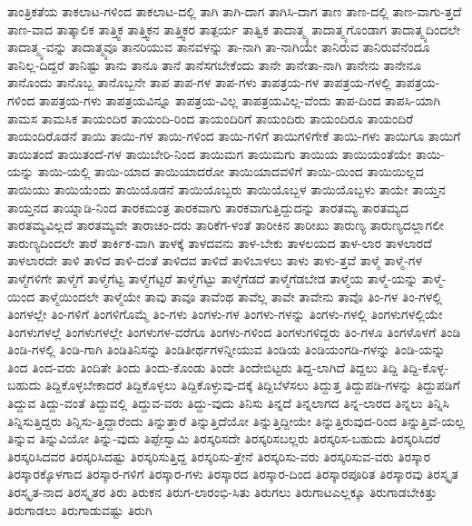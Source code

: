 {ತಾಂತ್ರಿಕತೆಯ
ತಾಕಲಾಟ-ಗಳಿಂದ
ತಾಕಲಾಟ-ದಲ್ಲಿ
ತಾಗಿ
ತಾಗಿ-ದಾಗ
ತಾಗಿಸಿ-ದಾಗ
ತಾಣ
ತಾಣ-ದಲ್ಲಿ
ತಾಣ-ವಾಗು-ತ್ತದೆ
ತಾಣ-ವಾದ
ತಾತ್ಕಾಲಿಕ
ತಾತ್ತ್ವಿಕ
ತಾತ್ತ್ವಿಕನ
ತಾತ್ತ್ವಿಕರ
ತಾತ್ಪರ್ಯ
ತಾತ್ವಿಕ
ತಾದಾತ್ಮ್ಯ
ತಾದಾತ್ಮ್ಯಗೊಂಡಾಗ
ತಾದಾತ್ಮ್ಯದಿಂದಲೇ
ತಾದಾತ್ಮ್ಯ-ವನ್ನು
ತಾದಾತ್ಮ್ಯವೂ
ತಾನರಿಯುವ
ತಾನವಳನ್ನು
ತಾ-ನಾಗಿ
ತಾ-ನಾಗಿಯೇ
ತಾನಿರುವ
ತಾನಿರುವೆನೆಂದೂ
ತಾನಿಲ್ಲ-ದಿದ್ದರೆ
ತಾನಿಷ್ಟು
ತಾನು
ತಾನೂ
ತಾನೆ
ತಾನೆಸಗಬೇಕೆಂದು
ತಾನೇ
ತಾನೇತಾ-ನಾಗಿ
ತಾನೇನು
ತಾನೇನೂ
ತಾನೊಂದು
ತಾನೊಬ್ಬ
ತಾನೊಬ್ಬನೇ
ತಾಪ
ತಾಪ-ಗಳ
ತಾಪ-ಗಳು
ತಾಪತ್ರಯ-ಗಳ
ತಾಪತ್ರಯ-ಗಳಲ್ಲಿ
ತಾಪತ್ರಯ-ಗಳಿಂದ
ತಾಪತ್ರಯ-ಗಳು
ತಾಪತ್ರಯವಿನ್ನೂ
ತಾಪತ್ರಯ-ವಿಲ್ಲ
ತಾಪತ್ರಯವಿಲ್ಲ-ವೆಂದು
ತಾಪ-ದಿಂದ
ತಾಪಸಿ-ಯಾಗಿ
ತಾಮಸ
ತಾಮಸಿಕ
ತಾಯಂದಿರ
ತಾಯಂದಿ-ರಿಂದ
ತಾಯಂದಿರಿಗೆ
ತಾಯಂದಿರು
ತಾಯಂದಿರೂ
ತಾಯಂದಿರೆ
ತಾಯಂದಿರೊಡನೆ
ತಾಯಿ
ತಾಯಿ-ಗಳ
ತಾಯಿ-ಗಳಿಂದ
ತಾಯಿ-ಗಳಿಗೆ
ತಾಯಿಗಳಿಗೇಕೆ
ತಾಯಿ-ಗಳು
ತಾಯಿಗೂ
ತಾಯಿಗೆ
ತಾಯಿತಂದೆ
ತಾಯಿತಂದೆ-ಗಳ
ತಾಯಿಬೇರಿ-ನಿಂದ
ತಾಯಿಮಗ
ತಾಯಿಮಗು
ತಾಯಿಯ
ತಾಯಿಯಂತೆಯೇ
ತಾಯಿ-ಯನ್ನು
ತಾಯಿ-ಯಲ್ಲಿ
ತಾಯಿ-ಯಾದ
ತಾಯಿಯಾದರೋ
ತಾಯಿಯಾದವಳಿಗೆ
ತಾಯಿ-ಯಿಂದ
ತಾಯಿಯಿಲ್ಲದ
ತಾಯಿಯು
ತಾಯಿಯೆಂದು
ತಾಯಿಯೊಡನೆ
ತಾಯಿಯೊಬ್ಬರು
ತಾಯಿಯೊಬ್ಬಳ
ತಾಯಿಯೊಬ್ಬಳು
ತಾಯೇ
ತಾಯ್ತನ
ತಾಯ್ತನದ
ತಾಯ್ನಾಡಿ-ನಿಂದ
ತಾರಕಮಂತ್ರ
ತಾರಕವಾಗು
ತಾರಕವಾಗುತ್ತಿದ್ದುದನ್ನು
ತಾರತಮ್ಯ
ತಾರತಮ್ಯದ
ತಾರತಮ್ಯವಿಲ್ಲದೆ
ತಾರತಮ್ಯವೇ
ತಾರಾಚಂ-ದರು
ತಾರಿಕೆಗ-ಳಂತೆ
ತಾರೀಕಿನ
ತಾರೀಖು
ತಾರುಣ್ಯ
ತಾರುಣ್ಯದಲ್ಲಾಗಲೀ
ತಾರುಣ್ಯದಿಂದಲೇ
ತಾರೆ
ತಾರ್ಕಿಕ-ವಾಗಿ
ತಾಳಕ್ಕೆ
ತಾಳದವನು
ತಾಳ-ಬೇಕು
ತಾಳಲಯದ
ತಾಳ-ಲಾರ
ತಾಳಲಾರದೆ
ತಾಳಲಾರದೇ
ತಾಳಿ
ತಾಳಿದ
ತಾಳಿ-ದಂತೆ
ತಾಳಿದವ
ತಾಳಿದೆ
ತಾಳಿಬಾಳಲು
ತಾಳು
ತಾಳು-ತ್ತವೆ
ತಾಳ್ಮೆ
ತಾಳ್ಮೆ-ಗಳ
ತಾಳ್ಮೆಗಳಿಗೇ
ತಾಳ್ಮೆಗೆ
ತಾಳ್ಮೆಗೆಟ್ಟ
ತಾಳ್ಮೆಗೆಟ್ಟರೆ
ತಾಳ್ಮೆಗೆಟ್ಟು
ತಾಳ್ಮೆಗೆಡದೆ
ತಾಳ್ಮೆಗೆಡಬೇಡ
ತಾಳ್ಮೆಯ
ತಾಳ್ಮೆ-ಯನ್ನು
ತಾಳ್ಮೆ-ಯಿಂದ
ತಾಳ್ಮೆಯಿಂದಲೇ
ತಾಳ್ಮೆಯೇ
ತಾವು
ತಾವೂ
ತಾವೆಂಥ
ತಾವೆಲ್ಲ
ತಾವೇ
ತಾವೇನು
ತಾವೊ
ತಿಂ-ಗಳ
ತಿಂ-ಗಳಲ್ಲಿ
ತಿಂಗಳಲ್ಲೇ
ತಿಂ-ಗಳಿಗೆ
ತಿಂಗಳಿಗೊಮ್ಮೆ
ತಿಂ-ಗಳು
ತಿಂಗಳು-ಗಳ
ತಿಂಗಳು-ಗಳನ್ನು
ತಿಂಗಳು-ಗಳಲ್ಲಿ
ತಿಂಗಳುಗಳಲ್ಲಿಯೇ
ತಿಂಗಳುಗಳಲ್ಲೆ
ತಿಂಗಳುಗಳಲ್ಲೇ
ತಿಂಗಳುಗಳ-ವರೆಗೂ
ತಿಂಗಳು-ಗಳಿಂದ
ತಿಂಗಳುಗಳಿದ್ದರು
ತಿಂ-ಗಳೂ
ತಿಂಗಳೊಳಗೆ
ತಿಂಡಿ
ತಿಂಡಿ-ಗಳಲ್ಲಿ
ತಿಂಡಿ-ಗಾಗಿ
ತಿಂಡಿತಿನಿಸನ್ನು
ತಿಂಡಿತೀರ್ಥಗಳನ್ನೀಯುವ
ತಿಂಡಿಯ
ತಿಂಡಿಯಂಗಡಿ-ಗಳನ್ನು
ತಿಂಡಿ-ಯನ್ನು
ತಿಂದ
ತಿಂದ-ವರು
ತಿಂದಿತೇ
ತಿಂದು
ತಿಂದು-ಕೊಂಡು
ತಿಂದೇ
ತಿಂದೇಬಿಟ್ಟರು
ತಿದ್ದ-ಲಾಗಿದೆ
ತಿದ್ದಲು
ತಿದ್ದಿ
ತಿದ್ದಿ-ಕೊಳ್ಳ-ಬಹುದು
ತಿದ್ದಿಕೊಳ್ಳಬೇಕಾದರೆ
ತಿದ್ದಿಕೊಳ್ಳಲು
ತಿದ್ದಿಕೊಳ್ಳುವು-ದಕ್ಕೆ
ತಿದ್ದಿಬೆಳೆಸಲು
ತಿದ್ದುತ್ತ
ತಿದ್ದುಪಡಿ-ಗಳನ್ನು
ತಿದ್ದುಪಡಿಗೆ
ತಿದ್ದುವ
ತಿದ್ದು-ವಂತೆ
ತಿದ್ದುವಲ್ಲಿ
ತಿದ್ದುವ-ವರು
ತಿದ್ದು-ವುದು
ತಿನಿಸು
ತಿನ್ನದೆ
ತಿನ್ನಲಾಗದ
ತಿನ್ನ-ಲಾರದ
ತಿನ್ನಲು
ತಿನ್ನಿಸಿ
ತಿನ್ನಿಸುತ್ತಿದ್ದರು
ತಿನ್ನಿಸು-ತ್ತಿದ್ದಾರೆಂದು
ತಿನ್ನುತ್ತಾರೆ
ತಿನ್ನುತ್ತಿದೆಯೋ
ತಿನ್ನುತ್ತಿದ್ದೀಯೇ
ತಿನ್ನುತ್ತಿರುವುದ-ರಿಂದ
ತಿನ್ನುತ್ತಿವೆ-ಯಲ್ಲ
ತಿನ್ನುವ
ತಿನ್ನುವಿಯೋ
ತಿನ್ನು-ವುದು
ತಿಪ್ಪೇಸ್ವಾಮಿ
ತಿರಸ್ಕರಿಸದೇ
ತಿರಸ್ಕರಿಸಬಲ್ಲರು
ತಿರಸ್ಕರಿಸ-ಬಹುದು
ತಿರಸ್ಕರಿಸಿದರೆ
ತಿರಸ್ಕರಿಸಿದವರ
ತಿರಸ್ಕರಿಸಿದಷ್ಟು
ತಿರಸ್ಕರಿಸುತ್ತಿದ್ದ
ತಿರಸ್ಕರಿಸು-ತ್ತೇನೆ
ತಿರಸ್ಕರಿಸು-ವರು
ತಿರಸ್ಕರಿಸುವ-ವರು
ತಿರಸ್ಕಾರ
ತಿರಸ್ಕಾರಕ್ಕೊಳಗಾದ
ತಿರಸ್ಕಾರ-ಗಳಿಗೆ
ತಿರಸ್ಕಾರ-ಗಳು
ತಿರಸ್ಕಾರದ
ತಿರಸ್ಕಾರ-ದಿಂದ
ತಿರಸ್ಕಾರಪೂರಿತ
ತಿರಸ್ಕಾರವು
ತಿರಸ್ಕೃತ
ತಿರಸ್ಕೃತ-ನಾದ
ತಿರಸ್ಕೃತರ
ತಿರು
ತಿರುಕನ
ತಿರುಗ-ಲಾರಂಭಿ-ಸಿತು
ತಿರುಗಲು
ತಿರುಗಾಟಎಲ್ಲಕ್ಕೂ
ತಿರುಗಾಡಬೇಕಿತ್ತು
ತಿರುಗಾಡಲು
ತಿರುಗಾಡುವಷ್ಟು
ತಿರುಗಿ
}

